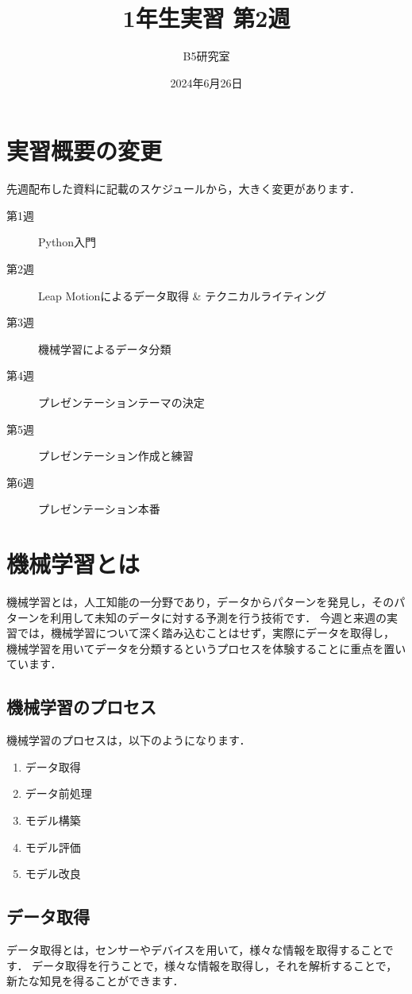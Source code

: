 \documentclass{jarticle}
\begin{document}
\title{1年生実習 第2週}
\author{B5研究室}
\date{2024年6月26日}
\maketitle

\section{実習概要の変更}

先週配布した資料に記載のスケジュールから，大きく変更があります．

\begin{description}
  \item[第1週] Python入門
  \item[第2週] Leap Motionによるデータ取得 \& テクニカルライティング
  \item[第3週] 機械学習によるデータ分類
  \item[第4週] プレゼンテーションテーマの決定
  \item[第5週] プレゼンテーション作成と練習
  \item[第6週] プレゼンテーション本番
\end{description}

\section{機械学習とは}
機械学習とは，人工知能の一分野であり，データからパターンを発見し，そのパターンを利用して未知のデータに対する予測を行う技術です．
今週と来週の実習では，機械学習について深く踏み込むことはせず，実際にデータを取得し，
機械学習を用いてデータを分類するというプロセスを体験することに重点を置いています．

\subsection{機械学習のプロセス}
機械学習のプロセスは，以下のようになります．
\begin{enumerate}
  \item データ取得
  \item データ前処理
  \item モデル構築
  \item モデル評価
  \item モデル改良
\end{enumerate}



\subsection{データ取得}
データ取得とは，センサーやデバイスを用いて，様々な情報を取得することです．
データ取得を行うことで，様々な情報を取得し，それを解析することで，新たな知見を得ることができます．
\end{document}
